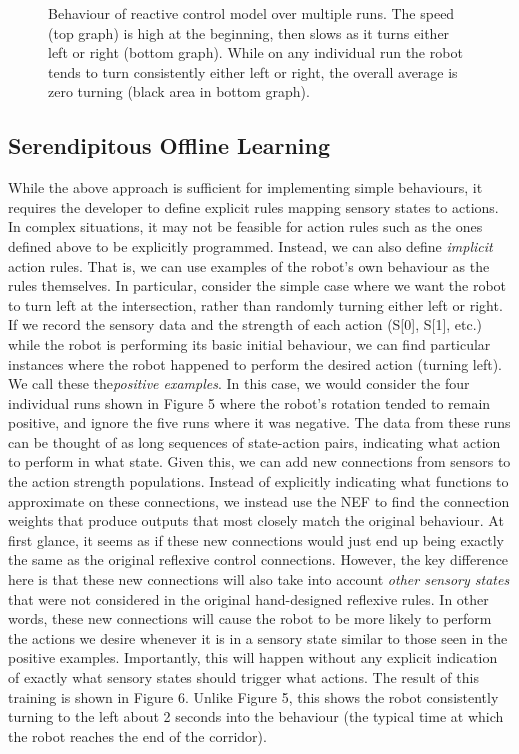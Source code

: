 \documentclass[conference]{IEEEtran}
\begin{document}
\begin{figure}[!t]
\label{Cnt}
\centering
\caption{Behaviour of reactive control model over multiple runs. The speed (top graph) is high at the beginning, then slows as it turns either left or right (bottom graph). While on any individual run the robot tends to turn consistently either left or right, the overall average is zero turning (black
area in bottom graph).}
\end{figure}

\subsection{Serendipitous Offline Learning}

While the above approach is sufficient for implementing
simple behaviours, it requires the developer to define explicit
rules mapping sensory states to actions. In complex
situations, it may not be feasible for action rules such as the
ones defined above to be explicitly programmed. Instead,
we can also define \textit{implicit} action rules. That is, we can use
examples of the robot's own behaviour as the rules
themselves.
In particular, consider the simple case where we want the
robot to turn left at the intersection, rather than randomly
turning either left or right. If we record the sensory data
and the strength of each action (S[0], S[1], etc.) while the
robot is performing its basic initial behaviour, we can find
particular instances where the robot happened to perform
the desired action (turning left). We call these the\textit{positive examples}. In this case, we would consider the four
individual runs shown in Figure 5 where the robot's rotation
tended to remain positive, and ignore the five runs where it
was negative.
The data from these runs can be thought of as long
sequences of state-action pairs, indicating what action to
perform in what state. Given this, we can add new
connections from sensors to the action strength populations.
Instead of explicitly indicating what functions to
approximate on these connections, we instead use the NEF
to find the connection weights that produce outputs that
most closely match the original behaviour.
At first glance, it seems as if these new connections
would just end up being exactly the same as the original
reflexive control connections. However, the key difference
here is that these new connections will also take into
account \textit{other sensory states} that were not considered in the
original hand-designed reflexive rules. In other words,
these new connections will cause the robot to be more likely
to perform the actions we desire whenever it is in a sensory
state similar to those seen in the positive examples.
Importantly, this will happen without any explicit indication
of exactly what sensory states should trigger what actions.
The result of this training is shown in Figure 6. Unlike
Figure 5, this shows the robot consistently turning to the left
about 2 seconds into the behaviour (the typical time at which
the robot reaches the end of the corridor).
\end{document}
